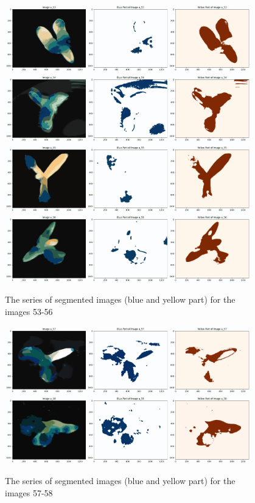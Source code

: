 \documentclass{article}
\begin{document}
\begin{figure}[h!]
\centering
\includegraphics[width=0.95\textwidth]{Report/Images/Appendix Images/ColorSegments/Image53.png}
\includegraphics[width=0.95\textwidth]{Report/Images/Appendix Images/ColorSegments/Image54.png}
\includegraphics[width=0.95\textwidth]{Report/Images/Appendix Images/ColorSegments/image55.png}
\includegraphics[width=0.95\textwidth]{Report/Images/Appendix Images/ColorSegments/image56.png}
\caption{The series of segmented images (blue and yellow part) for the images 53-56} 
\label{fig:segment53-56}
\end{figure}
\begin{figure}[h!]
\centering
\includegraphics[width=0.95\textwidth]{Report/Images/Appendix Images/ColorSegments/image57.png}
\includegraphics[width=0.95\textwidth]{Report/Images/Appendix Images/ColorSegments/image58.png}
\caption{The series of segmented images (blue and yellow part) for the images 57-58} 
\label{fig:segment57-58}
\end{figure}
\end{document}
